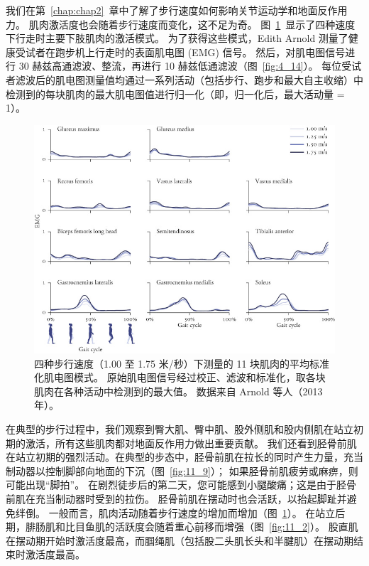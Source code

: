 我们在第~\ref{chap:chap2}~章中了解了步行速度如何影响关节运动学和地面反作用力。
肌肉激活度也会随着步行速度而变化，这不足为奇。
图~\ref{fig:11_8}~显示了四种速度下行走时主要下肢肌肉的激活模式。
为了获得这些模式，Edith Arnold 测量了健康受试者在跑步机上行走时的表面肌电图 (EMG) 信号。
然后，对肌电图信号进行 30 赫兹高通滤波、整流，再进行 10 赫兹低通滤波（图~\ref{fig:4_14}）。
每位受试者滤波后的肌电图测量值均通过一系列活动（包括步行、跑步和最大自主收缩）中检测到的每块肌肉的最大肌电图值进行归一化（即，归一化后，最大活动量 = 1）。


\begin{figure}[!htb]
	\centering
	\includegraphics[width=1.0\linewidth]{chap11/11_8}
	\caption{四种步行速度（1.00 至 1.75 米/秒）下测量的 11 块肌肉的平均标准化肌电图模式。
		原始肌电图信号经过校正、滤波和标准化，取各块肌肉在各种活动中检测到的最大值。
		数据来自 Arnold 等人（2013 年）。 \label{fig:11_8}}
\end{figure}


在典型的步行过程中，我们观察到臀大肌、臀中肌、股外侧肌和股内侧肌在站立初期的激活，所有这些肌肉都对地面反作用力做出重要贡献。
我们还看到胫骨前肌在站立初期的强烈活动。在典型的步态中，胫骨前肌在拉长的同时产生力量，充当制动器以控制脚部向地面的下沉（图~\ref{fig:11_9}）；
如果胫骨前肌疲劳或麻痹，则可能出现“脚拍”。
在剧烈徒步后的第二天，您可能感到小腿酸痛；这是由于胫骨前肌在充当制动器时受到的拉伤。
胫骨前肌在摆动时也会活跃，以抬起脚趾并避免绊倒。
一般而言，肌肉活动随着步行速度的增加而增加（图~\ref{fig:11_8}）。
在站立后期，腓肠肌和比目鱼肌的活跃度会随着重心前移而增强（图~\ref{fig:11_2}）。
股直肌在摆动期开始时激活度最高，而腘绳肌（包括股二头肌长头和半腱肌）在摆动期结束时激活度最高。


